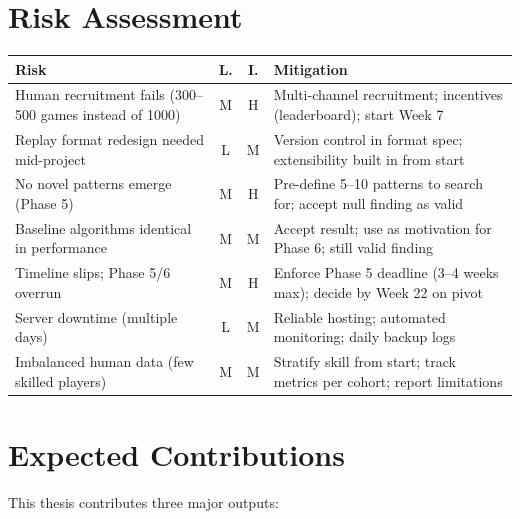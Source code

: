 \documentclass[a4paper]{article}
\begin{document}
\section{Risk Assessment}

\begin{table}[h]
\centering
\small
\begin{tabular}{|l|c|c|p{4cm}|}
\hline
\textbf{Risk} & \textbf{L.} & \textbf{I.} & \textbf{Mitigation} \\
\hline
Human recruitment fails (300--500 games instead of 1000) & M & H & Multi-channel recruitment; incentives (leaderboard); start Week 7 \\
\hline
Replay format redesign needed mid-project & L & M & Version control in format spec; extensibility built in from start \\
\hline
No novel patterns emerge (Phase 5) & M & H & Pre-define 5--10 patterns to search for; accept null finding as valid \\
\hline
Baseline algorithms identical in performance & M & M & Accept result; use as motivation for Phase 6; still valid finding \\
\hline
Timeline slips; Phase 5/6 overrun & M & H & Enforce Phase 5 deadline (3--4 weeks max); decide by Week 22 on pivot \\
\hline
Server downtime (multiple days) & L & M & Reliable hosting; automated monitoring; daily backup logs \\
\hline
Imbalanced human data (few skilled players) & M & M & Stratify skill from start; track metrics per cohort; report limitations \\
\hline
\end{tabular}
\end{table}

\section{Expected Contributions}

This thesis contributes three major outputs:
\end{document}
